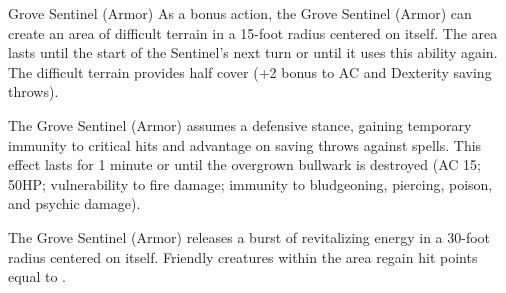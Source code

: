 \begin{DndMonster}[width=0.5\textwidth]{Grove Sentinel (Armor)}
     As a bonus action, the Grove Sentinel (Armor) can create an area of difficult terrain in a 15-foot radius centered on itself. The area lasts until the start of the Sentinel's next turn or until it uses this ability again. The difficult terrain provides half cover (+2 bonus to AC and Dexterity saving throws).
    
	The Grove Sentinel (Armor) assumes a defensive stance, gaining temporary immunity to critical hits and advantage on saving throws against spells. This effect lasts for 1 minute or until the overgrown bullwark is destroyed (AC 15; 50HP; vulnerability to fire damage; immunity to bludgeoning, piercing, poison, and psychic damage).
	
	The Grove Sentinel (Armor) releases a burst of revitalizing energy in a 30-foot radius centered on itself. Friendly creatures within the area regain hit points equal to .
      
\end{DndMonster}

\vfill\eject %

